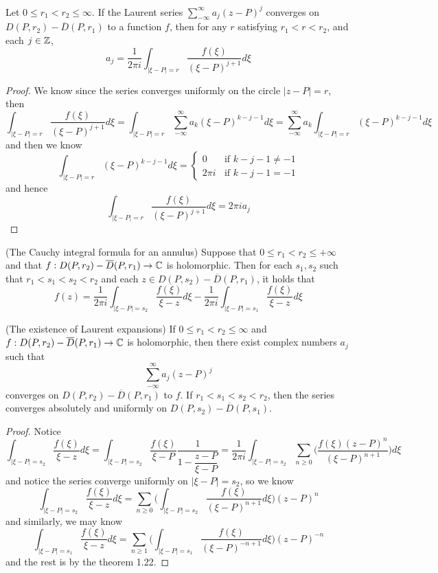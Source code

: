 \begin{proposition}
    Let $0\leq r_1<r_2\leq \infty$. If  the Laurent series $\sum\limits_{-\infty}^{\infty}a_j(z-P)^j$ converges on $D(P,r_2)-\overline{D}(P,r_1)$ to a function $f$, then for any $r$ satisfying $r_1<r<r_2$, and each $j\in\mathbb{Z}$,
    \[a_j = \dfrac{1}{2\pi i }\int_{|\xi-P|=r}\dfrac{f(\xi)}{(\xi-P)^{j+1}}d\xi\]
\end{proposition}
\begin{proof}\par
    We know since the series converges uniformly on the circle $|z-P| = r$, then
    \[
    \int_{|\xi-P| = r} \dfrac{f(\xi)}{(\xi-P)^{j+1}}d\xi = \int_{|\xi-P|=r} \sum\limits_{-\infty}^{\infty} a_k(\xi-P)^{k-j-1} d\xi = \sum\limits_{-\infty}^{\infty} a_k\int_{|\xi-P|=r} (\xi-P)^{k-j-1} d\xi 
    \]
    and then we know
    \[
    \int_{|\xi-P|=r}(\xi-P)^{k-j-1}d\xi = \begin{cases}
        0\quad&\text{if }k-j-1\neq -1 \\
        2\pi i&\text{if }k-j-1 = -1
    \end{cases}
    \]
    and hence
    \[
    \int_{|\xi-P| = r} \dfrac{f(\xi)}{(\xi-P)^{j+1}}d\xi = 2\pi ia_j
    \]
\end{proof}

\begin{theorem}
    (The Cauchy integral formula for an annulus) Suppose that $0\leq r_1<r_2\leq +\infty$ and that $f:D(P,r_2)-\overline{D}(P,r_1)\to\mathbb{C}$ is holomorphic. Then for each $s_1,s_2$ such that $r_1<s_1<s_2<r_2$ and each $z \in D(P,s_2)-\overline{D}(P,r_1)$, it holds that
    \[
    f(z) = \dfrac{1}{2\pi i }\int_{|\xi-P|=s_2}\dfrac{f(\xi)}{\xi-z}d\xi - \dfrac{1}{2\pi i}\int_{|\xi-P|=s_1}\dfrac{f(\xi)}{\xi-z}d\xi
    \] 
\end{theorem}

\begin{theorem}
    (The existence of Laurent expansions) If $0\leq r_1<r_2\leq \infty$ and $f:D(P,r_2)-\overline{D}(P,r_1)\to\mathbb{C}$ is holomorphic, then there exist complex numbers $a_j$ such that
    \[
    \sum_{-\infty}^{\infty} a_j(z-P)^j
    \]
    converges on $D(P,r_2)-\overline{D}(P,r_1)$ to $f$. If $r_1<s_1<s_2<r_2$, then the series converges absolutely and uniformly on $D(P,s_2)-\overline{D}(P,s_1)$.
\end{theorem}
\begin{proof}\par
    Notice
    \[
    \int_{|\xi-P|=s_2}\dfrac{f(\xi)}{\xi-z}d\xi = \int_{|\xi-P|=s_2}\dfrac{f(\xi)}{\xi-P}\dfrac{1}{1-\dfrac{z-P}{\xi-P}} = \dfrac{1}{2\pi i }\int_{|\xi-P|=s_2}\sum_{n\geq 0}\Big(\dfrac{f(\xi)(z-P)^n}{(\xi-P)^{n+1}}\Big)d\xi
    \]
    and notice the series converge uniformly on $|\xi-P|=s_2$, so we know
    \[
    \int_{|\xi-P|=s_2}\dfrac{f(\xi)}{\xi-z}d\xi = \sum_{n\geq 0}\Big(\int_{|\xi-P|=s_2}\dfrac{f(\xi)}{(\xi-P)^{n+1}}d\xi\Big)(z-P)^n
    \]
    and similarly, we may know
    \[
     \int_{|\xi-P|=s_1}\dfrac{f(\xi)}{\xi-z}d\xi = 
    \sum_{n\geq 1}\Big(\int_{|\xi-P|=s_1}\dfrac{f(\xi)}{(\xi-P)^{-n+1}}d\xi\Big)(z-P)^{-n}
    \]
    and the rest is by the theorem 1.22.
\end{proof}


